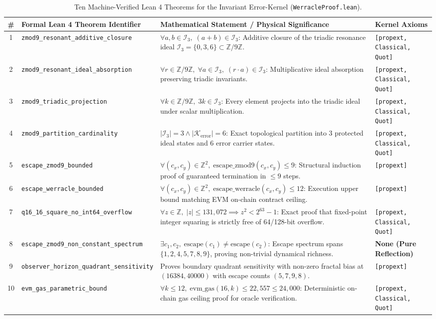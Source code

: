 \documentclass[11pt,a4paper]{article}
\newcommand{\Kerr}{\mathcal{K}_{\text{error}}}
\begin{document}
\begin{table}[h]
\centering\small
\caption{Ten Machine-Verified Lean 4 Theorems for the Invariant Error-Kernel (\texttt{WerracleProof.lean}).}\label{tab:lean_theorems}
\begin{tabularx}{\linewidth}{@{}clXl@{}}
\toprule
\textbf{\#} & \textbf{Formal Lean 4 Theorem Identifier} & \textbf{Mathematical Statement / Physical Significance} & \textbf{Kernel Axioms} \\
\midrule
1 & \texttt{zmod9\_resonant\_additive\_closure} & $\forall a,b \in \mathcal{I}_3,\; (a+b) \in \mathcal{I}_3$: Additive closure of the triadic resonance ideal $\mathcal{I}_3 = \{0, 3, 6\} \subset \mathbb{Z}/9\mathbb{Z}$. & \texttt{[propext, Classical, Quot]} \\
2 & \texttt{zmod9\_resonant\_ideal\_absorption} & $\forall r \in \mathbb{Z}/9\mathbb{Z},\; \forall a \in \mathcal{I}_3,\; (r \cdot a) \in \mathcal{I}_3$: Multiplicative ideal absorption preserving triadic invariants. & \texttt{[propext, Classical, Quot]} \\
3 & \texttt{zmod9\_triadic\_projection} & $\forall k \in \mathbb{Z}/9\mathbb{Z},\; 3k \in \mathcal{I}_3$: Every element projects into the triadic ideal under scalar multiplication. & \texttt{[propext, Classical, Quot]} \\
4 & \texttt{zmod9\_partition\_cardinality} & $|\mathcal{I}_3| = 3 \land |\Kerr| = 6$: Exact topological partition into 3 protected ideal states and 6 error carrier states. & \texttt{[propext, Classical, Quot]} \\
5 & \texttt{escape\_zmod9\_bounded} & $\forall (c_x, c_y) \in \mathbb{Z}^2,\; \text{escape\_zmod9}(c_x, c_y) \le 9$: Structural induction proof of guaranteed termination in $\le 9$ steps. & \texttt{[propext]} \\
6 & \texttt{escape\_werracle\_bounded} & $\forall (c_x, c_y) \in \mathbb{Z}^2,\; \text{escape\_werracle}(c_x, c_y) \le 12$: Execution upper bound matching EVM on-chain contract ceiling. & \texttt{[propext]} \\
7 & \texttt{q16\_16\_square\_no\_int64\_overflow} & $\forall z \in \mathbb{Z},\; |z| \le 131{,}072 \implies z^2 < 2^{63}-1$: Exact proof that fixed-point integer squaring is strictly free of 64/128-bit overflow. & \texttt{[propext, Classical, Quot]} \\
8 & \texttt{escape\_zmod9\_non\_constant\_spectrum} & $\exists c_1, c_2,\; \text{escape}(c_1) \neq \text{escape}(c_2)$: Escape spectrum spans $\{1,2,4,5,7,8,9\}$, proving non-trivial dynamical richness. & \textbf{None (Pure Reflection)} \\
9 & \texttt{observer\_horizon\_quadrant\_sensitivity} & Proves boundary quadrant sensitivity with non-zero fractal bias at $(16384, 40000)$ with escape counts $(5, 7, 9, 8)$. & \texttt{[propext]} \\
10 & \texttt{evm\_gas\_parametric\_bound} & $\forall k \le 12,\; \text{evm\_gas}(16, k) \le 22{,}557 \le 24{,}000$: Deterministic on-chain gas ceiling proof for oracle verification. & \texttt{[propext, Classical, Quot]} \\
\bottomrule
\end{tabularx}
\end{table}
\end{document}
